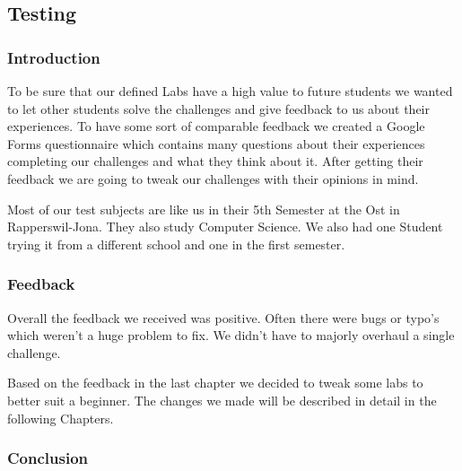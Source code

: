 \subsection{Testing}


\subsubsection{Introduction}
To be sure that our defined Labs have a high value to future students we wanted to let other students solve the challenges and give feedback to us about their experiences. To have some sort of comparable feedback we created a Google Forms questionnaire which contains many questions about their experiences completing our challenges and what they think about it. After getting their feedback we are going to tweak our challenges with their opinions in mind.

Most of our test subjects are like us in their 5th Semester at the Ost in Rapperswil-Jona. They also study Computer Science. We also had one Student trying it from a different school and one in the first semester.

\subsubsection{Feedback}
Overall the feedback we received was positive. Often there were bugs or typo's which weren't a huge problem to fix. We didn't have to majorly overhaul a single challenge.

Based on the feedback in the last chapter we decided to tweak some labs to better suit a beginner. The changes we made will be described in detail in the following Chapters.

\subsubsection{Conclusion}
